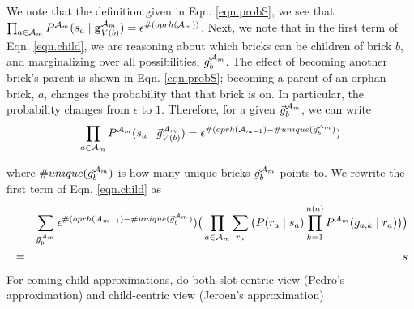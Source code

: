 \documentclass[11pt]{article}
\newcommand{\A}{{\cal A}}
\newcommand{\Am}{\A_{m}}
\begin{document}
We note that the definition given in Eqn. \ref{eqn.probS}, we see that $\prod_{a \in {\Am}} P^{\Am}(s_a \mid \mathbf{g}^{\Am}_{V({b})}) = \epsilon^{\#(oprh(\Am))}$. Next, we note that in the first term of Eqn. \ref{eqn.child}, we are reasoning about which bricks can be children of brick $b$, and marginalizing over all possibilities, $\vec{g}_b^{\Am}$. The effect of becoming another brick's parent is shown in Eqn. \ref{eqn.probS}; becoming a parent of an orphan brick, $a$, changes the probability that that brick is on. In particular, the probability changes from $\epsilon$ to $1$. Therefore, for a given $\vec{g}^{\Am}_{b}$, we can write
%
\begin{eqnarray}
\prod_{a \in {\Am}} P^{\Am}(s_a \mid \vec{g}^{\Am}_{V({b})}) = \epsilon^{\#(oprh(\A_{m-1}) - \#unique( \vec{g}_b^{\Am})})
\end{eqnarray}

where $\#unique(\vec{g}_b^{\Am})$ is how many unique bricks $\vec{g}_b^{\Am}$ points to. We rewrite the first term of Eqn. \ref{eqn.child} as
%
\begin{align}
& & \sum_{\vec{g}^{\Am}_{b}}  \epsilon^{\#(oprh(\A_{m-1}) - \#unique( \vec{g}_b^{\Am})}) \big( \prod_{a \in {\A_{m}}} \sum_{r_a} \big(P(r_a \mid s_a) \prod_{k=1}^{n(a)} P^{\Am}(g_{a,k} \mid r_a) \big) \big) \\
&=&  s
\end{align}
%
For coming child approximations, do both slot-centric view (Pedro's approximation) and child-centric view (Jeroen's approximation)




\end{document}
